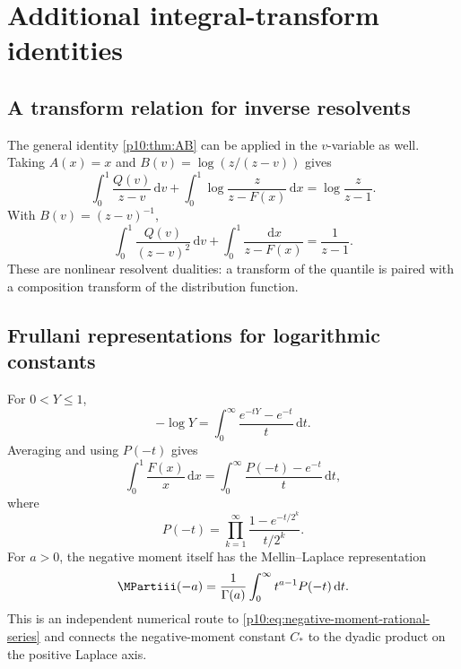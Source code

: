 \documentclass[11pt,oneside]{article}
\theoremstyle{definition}
\theoremstyle{remark}
\newcommand{\F}{F}
\newcommand{\Q}{Q}
\newcommand{\dd}{\,\mathrm d}
\newcommand{\1}{\mathbf 1}
\begin{document}
\section{Additional integral-transform identities}

\subsection{A transform relation for inverse resolvents}

The general identity \cref{p10:thm:AB} can be applied in the \(v\)-variable as well.  Taking
\(A(x)=x\) and
\(B(v)=\log(z/(z-v))\) gives
\begin{equation}\label{p10:eq:inverse-log-resolvent}
 \int_0^1\frac{\Q(v)}{z-v}\dd v
 +\int_0^1\log\frac{z}{z-\F(x)}\dd x
 =\log\frac{z}{z-1}.
\end{equation}
With \(B(v)=(z-v)^{-1}\),
\begin{equation}\label{p10:eq:inverse-square-resolvent}
 \int_0^1\frac{\Q(v)}{(z-v)^2}\dd v
 +\int_0^1\frac{\dd x}{z-\F(x)}
 =\frac1{z-1}.
\end{equation}
These are nonlinear resolvent dualities: a transform of the quantile is paired with a
composition transform of the distribution function.

\subsection{Frullani representations for logarithmic constants}

For \(0<Y\le1\),
\begin{equation}\label{p10:eq:Frullani-log}
 -\log Y=\int_0^\infty\frac{e^{-tY}-e^{-t}}t\dd t.
\end{equation}
Averaging and using \(P(-t)\) gives
\begin{equation}\label{p10:eq:log-Frullani-product}
 \int_0^1\frac{\F(x)}x\dd x
 =\int_0^\infty\frac{P(-t)-e^{-t}}t\dd t,
\end{equation}
where
\begin{equation}\label{p10:eq:Pminus-product}
 P(-t)=\prod_{k=1}^{\infty}
 \frac{1-e^{-t/2^k}}{t/2^k}.
\end{equation}
For \(a>0\), the negative moment itself has the Mellin--Laplace representation
\begin{equation}\label{p10:eq:negative-Mellin-Laplace}
 \MPartiii(-a)=\frac1{\Gamma(a)}\int_0^\infty t^{a-1}P(-t)\dd t.
\end{equation}
This is an independent numerical route to \cref{p10:eq:negative-moment-rational-series} and
connects the negative-moment constant \(C_*\) to the dyadic product on the positive
Laplace axis.
\end{document}
